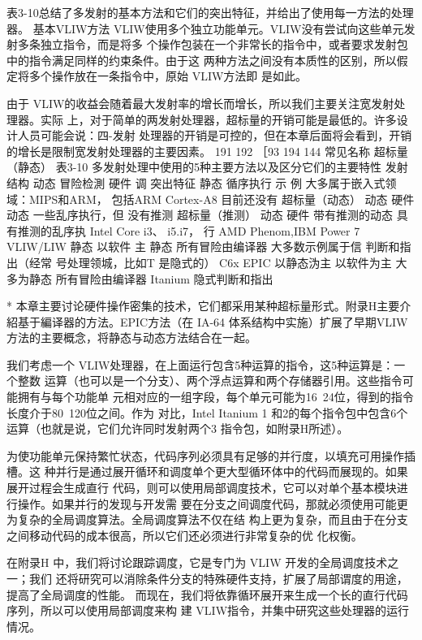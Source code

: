 表3-10总结了多发射的基本方法和它们的突出特征，并给出了使用每一方法的处理器。
基本VLIW方法
VLIW使用多个独立功能单元。VLIW没有尝试向这些单元发射多条独立指令，而是将多
个操作包装在一个非常长的指令中，或者要求发射包中的指令满足同样的约束条件。由于这
两种方法之间没有本质性的区别，所以假定将多个操作放在一条指令中，原始 VLIW方法即
是如此。

由于 VLIW的收益会随着最大发射率的增长而增长，所以我们主要关注宽发射处理器。实际
上，对于简单的两发射处理器，超标量的开销可能是最低的。许多设计人员可能会说：四-发射
处理器的开销是可控的，但在本章后面将会看到，开销的增长是限制宽发射处理器的主要因素。
191
192
［93
194
144
常见名称
超标量（静态）
表3-10 多发射处理中使用的5种主要方法以及区分它们的主要特性
发射结构
动态
冒险检測
硬件
调
突出特征
静态
循序执行
示
例
大多属于嵌入式领
域：MIPS和ARM，
包括ARM Cortex-A8
目前还没有
超标量（动态）
动态
硬件
动态
一些乱序执行，但
没有推测
超标量（推测）
动态
硬件
带有推测的动态
具有推测的乱序执
Intel Core i3、 i5.i7，
行
AMD Phenom,IBM
Power 7
VLIW/LIW
静态
以软件 主
静态
所有冒险由编译器
大多数示例属于信
判断和指出（经常
号处理领城，比如T
是隐式的）
C6x
EPIC
以静态沩主 以软件为主
大多为静态
所有冒险由编译器
Itanium
隐式判断和指出

* 本章主要讨论硬件操作密集的技术，它们都采用某种超标量形式。附录H主要介紹基于編译器的方法。EPIC方法（在
IA-64 体系结构中实施）扩展了早期VLIW 方法的主要概念，将静态与动态方法结合在一起。

我们考虑一个 VLIW处理器，在上面运行包含5种运算的指令，这5种运算是：一个整数
运算（也可以是一个分支）、两个浮点运算和两个存储器引用。这些指令可能拥有与每个功能单
元相对应的一组字段，每个单元可能为16~24位，得到的指令长度介于80~120位之间。作为
对比，Intel Itanium 1 和2的每个指令包中包含6个运算（也就是说，它们允许同时发射两个3
指令包，如附录H所述）。

为使功能单元保持繁忙状态，代码序列必须具有足够的并行度，以填充可用操作插槽。这
种并行是通过展开循环和调度单个更大型循环体中的代码而展现的。如果展开过程会生成直行
代码，则可以使用局部调度技术，它可以对单个基本模块进行操作。如果并行的发现与开发需
要在分支之间调度代码，那就必须使用可能更为复杂的全局调度算法。全局调度算法不仅在结
构上更为复杂，而且由于在分支之间移动代码的成本很高，所以它们还必须进行非常复杂的优
化权衡。

在附录H 中，我们将讨论跟踪调度，它是专门为 VLIW 开发的全局调度技术之一；我们
还将研究可以消除条件分支的特殊硬件支持，扩展了局部谓度的用途，提高了全局调度的性能。
而现在，我们将依靠循环展开来生成一个长的直行代码序列，所以可以使用局部调度来构
建 VLIW指令，并集中研究这些处理器的运行情况。

